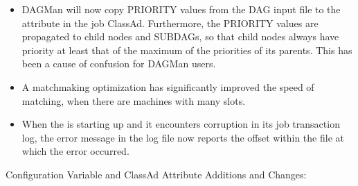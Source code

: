 \begin{itemize}
\item DAGMan will now copy PRIORITY values from the DAG input file to 
the  attribute in the job ClassAd.  
Furthermore, the PRIORITY values are propagated to child nodes and SUBDAGs, 
so that child nodes always have priority at least that
of the maximum of the priorities of its parents.  
This has been a cause of confusion for DAGMan users.


\item A matchmaking optimization has significantly improved the speed 
of matching,
when there are machines with many slots.

\item When the  is starting up and it encounters corruption
in its job transaction log, the error message in the log file now reports
the offset within the file at which the error occurred.

\end{itemize}

\noindent Configuration Variable and ClassAd Attribute Additions and Changes:

